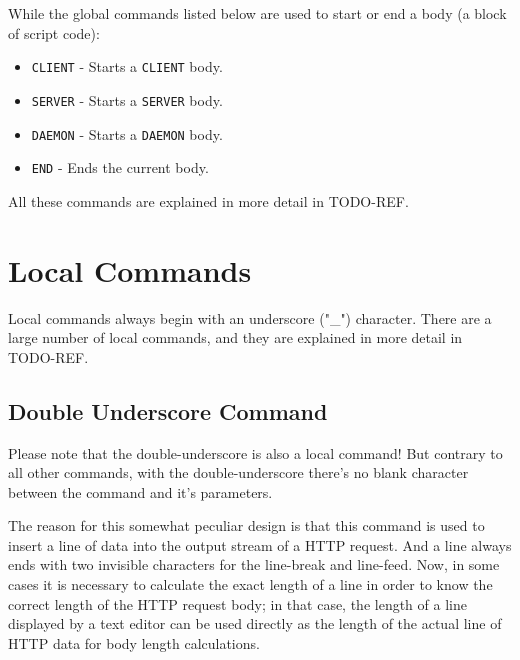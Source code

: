 While the global commands listed below are used to start or end 
a body (a block of script code):

\begin{itemize}
\item \texttt{CLIENT} - Starts a \texttt{CLIENT} body.
\item \texttt{SERVER} - Starts a \texttt{SERVER} body.
\item \texttt{DAEMON} - Starts a \texttt{DAEMON} body.
\item \texttt{END} - Ends the current body.
\end{itemize}

All these commands are explained in more detail in TODO-REF.


\newpage
\section{Local Commands}

Local commands always begin with an underscore ("\_") character. There are a 
large number of local commands, and they are explained in more detail in TODO-REF.

\subsection*{Double Underscore Command}

Please note that the double-underscore is also a local command! But contrary to 
all other commands, with the double-underscore there's no blank character between 
the command and it's parameters.

The reason for this somewhat peculiar design is that this command is used to 
insert a line of data into the output stream of a HTTP request. And a line always 
ends with two invisible characters for the line-break and line-feed. Now, in some 
cases it is necessary to calculate the exact length of a line in order to know the 
correct length of the HTTP request body; in that case, the length of a line 
displayed by a text editor can be used directly as the length of the actual line 
of HTTP data for body length calculations.


